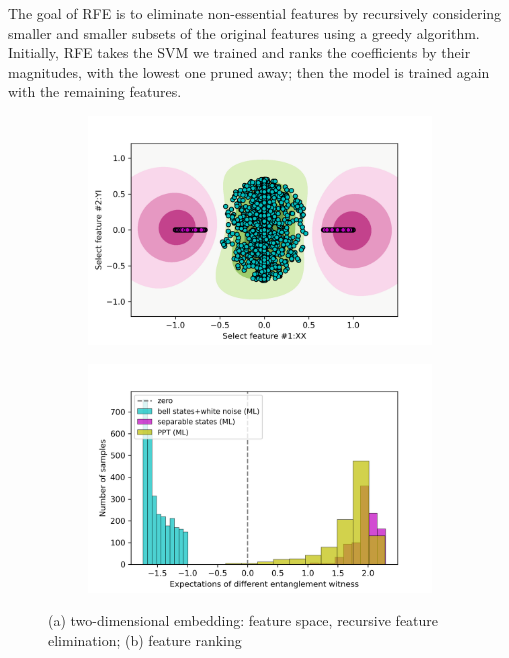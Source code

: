 \documentclass[
reprint,
aps,
pra,
floatfix,
]{revtex4-2}
\theoremstyle{plain}
\theoremstyle{definition}
\begin{document}
The goal of RFE is to eliminate non-essential features by recursively considering smaller and smaller subsets of the original features using a greedy algorithm. Initially, RFE takes the SVM we trained and ranks the coeﬃcients by their magnitudes, with the lowest one pruned away; then the model is trained again with the remaining features.
\begin{figure}[!ht]
	\centering
	\begin{subfigure}{0.49\textwidth}
	\centering
		\includegraphics[width=.9\linewidth]{./Code/feature_space_2d.png}
	\end{subfigure}
	\begin{subfigure}{0.49\textwidth}
	\centering
		\includegraphics[width=.9\linewidth]{./Code/two_qubit_bell_ml.png}
	\end{subfigure}
	\caption{(a) two-dimensional embedding: feature space, recursive feature elimination; (b) feature ranking}
\end{figure}
\end{document}
